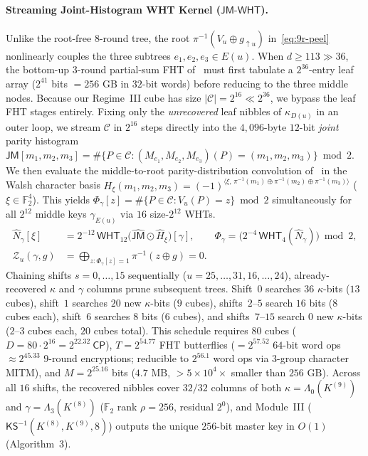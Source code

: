 \documentclass[11pt,a4paper]{article}
\theoremstyle{definition}
\theoremstyle{remark}
\newcommand{\Ftwo}{\mathbb{F}_2}
\newcommand{\CP}{\mathsf{CP}}
\begin{document}
\paragraph{Streaming Joint-Histogram WHT Kernel ($\mathsf{JM\text{-}WHT}$).}
Unlike the root-free $8$-round tree, the root $\pi^{-1}(V_u \oplus g_{\uparrow u})$ in~\eqref{eq:9r-peel} nonlinearly couples the three subtrees $e_1, e_2, e_3 \in E(u)$. When $d \ge 113 \gg 36$, the bottom-up $3$-round partial-sum FHT of~\cite[$\S$3.2, Algorithm~3]{DG25} must first tabulate a $2^{36}$-entry leaf array ($2^{41}$ bits $= 256\text{ GB}$ in $32$-bit words) before reducing to the three middle nodes. Because our Regime~III cube has size $|\mathcal{C}| = 2^{16} \ll 2^{36}$, we bypass the leaf FHT stages entirely. Fixing only the \emph{unrecovered} leaf nibbles of $\kappa_{D(u)}$ in an outer loop, we stream $\mathcal{C}$ in $2^{16}$ steps directly into the $4{,}096$-byte $12$-bit \emph{joint} parity histogram $\mathsf{JM}[m_1, m_2, m_3] = \#\{P \in \mathcal{C} : (M_{e_1}, M_{e_2}, M_{e_3})(P) = (m_1, m_2, m_3)\} \bmod 2$. We then evaluate the middle-to-root parity-distribution convolution of~\cite{DGK24,DG25} in the Walsh character basis $H_\xi(m_1,m_2,m_3) = (-1)^{\langle \xi,\, \pi^{-1}(m_1)\oplus\pi^{-1}(m_2)\oplus\pi^{-1}(m_3)\rangle}$ ($\xi \in \Ftwo^4$). This yields $\Phi_\gamma[z] = \#\{P \in \mathcal{C} : V_u(P) = z\} \bmod 2$ simultaneously for all $2^{12}$ middle keys $\gamma_{E(u)}$ via $16$ size-$2^{12}$ WHTs.
\begin{equation}
\label{eq:9r-wht}
\begin{aligned}
\widehat{N}_\gamma[\xi] &= 2^{-12}\,\mathsf{WHT}_{12}\!\bigl(\widehat{\mathsf{JM}} \odot \widehat{H}_\xi\bigr)[\gamma], \qquad
\Phi_\gamma = \bigl(2^{-4}\,\mathsf{WHT}_4(\widehat{N}_\gamma)\bigr) \bmod 2, \\
\mathcal{Z}_u(\gamma, g) &= \bigoplus_{z : \Phi_\gamma[z] = 1} \pi^{-1}(z \oplus g) = 0.
\end{aligned}
\end{equation}
Chaining shifts $s = 0, \dots, 15$ sequentially ($u = 25,\dots,31, 16,\dots,24$), already-recovered $\kappa$ and $\gamma$ columns prune subsequent trees. Shift~$0$ searches $36$ $\kappa$-bits ($13$ cubes), shift~$1$ searches $20$ new $\kappa$-bits ($9$ cubes), shifts~$2$--$5$ search $16$ bits ($8$ cubes each), shift~$6$ searches $8$ bits ($6$ cubes), and shifts~$7$--$15$ search $0$ new $\kappa$-bits ($2$--$3$ cubes each, $20$ cubes total). This schedule requires $80$ cubes ($D = 80 \cdot 2^{16} = 2^{22.32}~\CP$), $T = 2^{54.77}$ FHT butterflies ($= 2^{57.52}$ $64$-bit word ops $\approx 2^{45.33}$ $9$-round encryptions; reducible to $2^{56.1}$ word ops via $3$-group character MITM), and $M = 2^{25.16}$ bits ($4.7\text{ MB}$, $>5 \times 10^4\times$ smaller than $256\text{ GB}$). Across all $16$ shifts, the recovered nibbles cover $32/32$ columns of both $\kappa = \Lambda_0(K^{(9)})$ and $\gamma = \Lambda_3(K^{(8)})$ ($\Ftwo$ rank $\rho = 256$, residual $2^0$), and Module~III ($\mathsf{KS}^{-1}(K^{(8)}, K^{(9)}, 8)$) outputs the unique $256$-bit master key in $O(1)$ (Algorithm~3).
\end{document}
